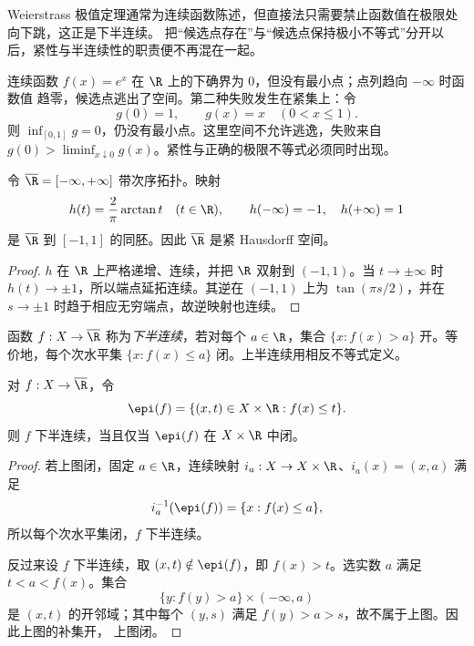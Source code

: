 \begin{remark}
Weierstrass 极值定理通常为连续函数陈述，但直接法只需要禁止函数值在极限处向下跳，这正是下半连续。
把“候选点存在”与“候选点保持极小不等式”分开以后，紧性与半连续性的职责便不再混在一起。
\end{remark}

\begin{example}[两种最小化失败]\label{ex:1-2-3-3}
连续函数 \(f(x)=e^x\) 在 \(\R\) 上的下确界为 \(0\)，但没有最小点；点列趋向 \(-\infty\) 时函数值
趋零，候选点逃出了空间。第二种失败发生在紧集上：令
\[
 g(0)=1,\qquad g(x)=x\quad(0<x\le1).
\]
则 \(\inf_{[0,1]}g=0\)，仍没有最小点。这里空间不允许逃逸，失败来自
\(g(0)>\liminf_{x\downarrow0}g(x)\)。紧性与正确的极限不等式必须同时出现。
\end{example}

\begin{definition}[紧扩展实直线]\label{def:1-2-3-extended-line}
令 \(\overline\R=[-\infty,+\infty]\) 带次序拓扑。映射
\[
 h(t)=\frac{2}{\pi}\arctan t\quad(t\in\R),\qquad
 h(-\infty)=-1,\quad h(+\infty)=1
\]
是 \(\overline\R\) 到 \([-1,1]\) 的同胚。因此 \(\overline\R\) 是紧 Hausdorff 空间。
\end{definition}
\begin{proof}
\(h\) 在 \(\R\) 上严格递增、连续，并把 \(\R\) 双射到 \((-1,1)\)。当
\(t\to\pm\infty\) 时 \(h(t)\to\pm1\)，所以端点延拓连续。其逆在 \((-1,1)\) 上为
\(\tan(\pi s/2)\)，并在 \(s\to\pm1\) 时趋于相应无穷端点，故逆映射也连续。
\end{proof}

\begin{definition}[下半连续]\label{def:1-2-3-1}
函数 \(f:X\to\overline\R\) 称为\emph{下半连续}，若对每个 \(a\in\R\)，集合
\(\{x:f(x)>a\}\) 开。等价地，每个次水平集 \(\{x:f(x)\le a\}\) 闭。上半连续用相反不等式定义。
\end{definition}

\begin{proposition}[上图判别]\label{proposition:1-2-3-epigraph}
对 \(f:X\to\overline\R\)，令
\[
 \epi(f)=\{(x,t)\in X\times\R:f(x)\le t\}.
\]
则 \(f\) 下半连续，当且仅当 \(\epi(f)\) 在 \(X\times\R\) 中闭。
\end{proposition}
\begin{proof}
若上图闭，固定 \(a\in\R\)，连续映射 \(i_a:X\to X\times\R\)、\(i_a(x)=(x,a)\) 满足
\[
 i_a^{-1}(\epi(f))=\{x:f(x)\le a\},
\]
所以每个次水平集闭，\(f\) 下半连续。

反过来设 \(f\) 下半连续，取 \((x,t)\notin\epi(f)\)，即 \(f(x)>t\)。选实数 \(a\) 满足
\(t<a<f(x)\)。集合
\[
 \{y:f(y)>a\}\times(-\infty,a)
\]
是 \((x,t)\) 的开邻域；其中每个 \((y,s)\) 满足 \(f(y)>a>s\)，故不属于上图。因此上图的补集开，
上图闭。
\end{proof}

